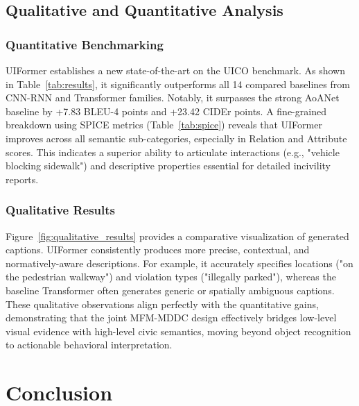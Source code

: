 \documentclass[lettersize,journal]{IEEEtran}
\begin{document}
	
	\subsection{Qualitative and Quantitative Analysis}
	
	\subsubsection{Quantitative Benchmarking}
	
	UIFormer establishes a new state-of-the-art on the UICO benchmark. As shown in Table~\ref{tab:results}, it significantly outperforms all 14 compared baselines from CNN-RNN and Transformer families. Notably, it surpasses the strong AoANet baseline by +7.83 BLEU-4 points and +23.42 CIDEr points. A fine-grained breakdown using SPICE metrics (Table~\ref{tab:spice}) reveals that UIFormer improves across all semantic sub-categories, especially in Relation and Attribute scores. This indicates a superior ability to articulate interactions (e.g., "vehicle blocking sidewalk") and descriptive properties essential for detailed incivility reports.
	
	\subsubsection{Qualitative Results}
	
	Figure~\ref{fig:qualitative_results} provides a comparative visualization of generated captions. UIFormer consistently produces more precise, contextual, and normatively-aware descriptions. For example, it accurately specifies locations ("on the pedestrian walkway") and violation types ("illegally parked"), whereas the baseline Transformer often generates generic or spatially ambiguous captions. These qualitative observations align perfectly with the quantitative gains, demonstrating that the joint MFM-MDDC design effectively bridges low-level visual evidence with high-level civic semantics, moving beyond object recognition to actionable behavioral interpretation.
	
	\section{Conclusion}
	
\end{document}
